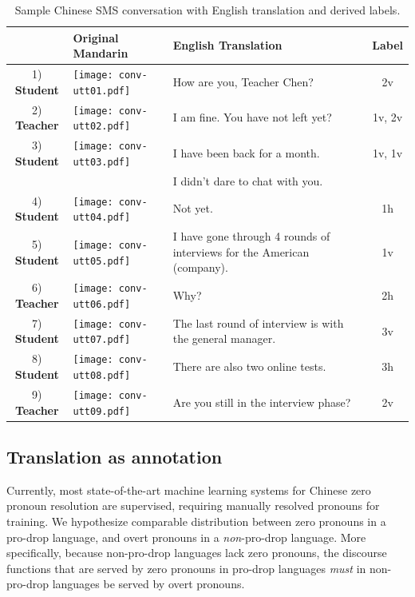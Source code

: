 \documentclass[11pt]{report}
\newcommand{\speaker}[1]{{\bf\footnotesize\textsf{#1}}}
\begin{document}
\begin{table}[t]
\begin{center}
\begin{footnotesize}
\begin{tabular}{|c|l|p{7cm}|c|}
\hline
                  & \bf Original Mandarin & \bf English Translation & \bf Label \\ 
\hline
1) \speaker{Student} & \texttt{[image: conv-utt01.pdf]} & How are you, Teacher Chen? & 2v \\
2) \speaker{Teacher} & \texttt{[image: conv-utt02.pdf]} & I am fine. You have not left yet?  & 1v, 2v\\
3) \speaker{Student} & \texttt{[image: conv-utt03.pdf]} & I have been back for a month.  & 1v, 1v \\
                  &                                                & I didn't dare to chat with you. & \\
4) \speaker{Student} & \texttt{[image: conv-utt04.pdf]} & Not yet.  & 1h \\
5) \speaker{Student} & \texttt{[image: conv-utt05.pdf]} & I have gone through 4 rounds of interviews for the American (company). & 1v \\
6) \speaker{Teacher} & \texttt{[image: conv-utt06.pdf]} & Why? & 2h \\
7) \speaker{Student} & \texttt{[image: conv-utt07.pdf]} & The last round of interview is with the general manager. & 3v \\
8) \speaker{Student} & \texttt{[image: conv-utt08.pdf]} & There are also two online tests. & 3h \\
9) \speaker{Teacher} & \texttt{[image: conv-utt09.pdf]} & Are you still in the interview phase? & 2v \\
\hline
\end{tabular}
\end{footnotesize}
\end{center}
\caption{Sample Chinese SMS conversation with English translation and derived labels.}
\label{conv}
\end{table}

\subsection{Translation as annotation} \label{taa}

Currently, most state-of-the-art machine learning systems for Chinese zero pronoun resolution are supervised, requiring manually resolved pronouns for training.
We hypothesize comparable distribution between zero pronouns in a pro-drop language, and overt pronouns in a \emph{non}-pro-drop language. More specifically, because non-pro-drop languages lack zero pronouns, the discourse functions that are served by zero pronouns in pro-drop languages \emph{must} in non-pro-drop languages be served by overt pronouns.
\end{document}
